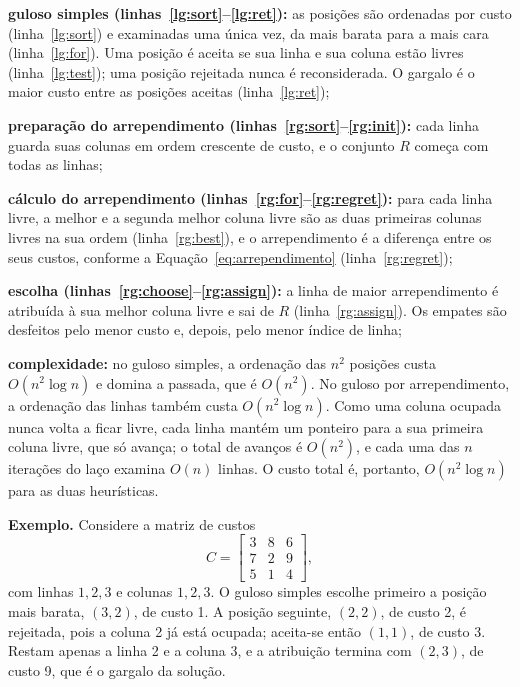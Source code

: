 \begin{alineas}
    \item \textbf{guloso simples (linhas~\ref{lg:sort}--\ref{lg:ret}):} as posições são ordenadas por custo (linha~\ref{lg:sort}) e examinadas uma única vez, da mais barata para a mais cara (linha~\ref{lg:for}). Uma posição é aceita se sua linha e sua coluna estão livres (linha~\ref{lg:test}); uma posição rejeitada nunca é reconsiderada. O gargalo é o maior custo entre as posições aceitas (linha~\ref{lg:ret});
    \item \textbf{preparação do arrependimento (linhas~\ref{rg:sort}--\ref{rg:init}):} cada linha guarda suas colunas em ordem crescente de custo, e o conjunto $R$ começa com todas as linhas;
    \item \textbf{cálculo do arrependimento (linhas~\ref{rg:for}--\ref{rg:regret}):} para cada linha livre, a melhor e a segunda melhor coluna livre são as duas primeiras colunas livres na sua ordem (linha~\ref{rg:best}), e o arrependimento é a diferença entre os seus custos, conforme a Equação~\eqref{eq:arrependimento} (linha~\ref{rg:regret});
    \item \textbf{escolha (linhas~\ref{rg:choose}--\ref{rg:assign}):} a linha de maior arrependimento é atribuída à sua melhor coluna livre e sai de $R$ (linha~\ref{rg:assign}). Os empates são desfeitos pelo menor custo e, depois, pelo menor índice de linha;
    \item \textbf{complexidade:} no guloso simples, a ordenação das $n^2$ posições custa $O(n^2 \log n)$ e domina a passada, que é $O(n^2)$. No guloso por arrependimento, a ordenação das linhas também custa $O(n^2 \log n)$. Como uma coluna ocupada nunca volta a ficar livre, cada linha mantém um ponteiro para a sua primeira coluna livre, que só avança; o total de avanços é $O(n^2)$, e cada uma das $n$ iterações do laço examina $O(n)$ linhas. O custo total é, portanto, $O(n^2 \log n)$ para as duas heurísticas.
\end{alineas}

\textbf{Exemplo.} Considere a matriz de custos
\begin{equation}
    C = \begin{bmatrix} 3 & 8 & 6 \\ 7 & 2 & 9 \\ 5 & 1 & 4 \end{bmatrix},
\end{equation}
com linhas $1, 2, 3$ e colunas $1, 2, 3$. O guloso simples escolhe primeiro a posição mais barata, $(3, 2)$, de custo 1. A posição seguinte, $(2, 2)$, de custo 2, é rejeitada, pois a coluna 2 já está ocupada; aceita-se então $(1, 1)$, de custo 3. Restam apenas a linha 2 e a coluna 3, e a atribuição termina com $(2, 3)$, de custo 9, que é o gargalo da solução.

